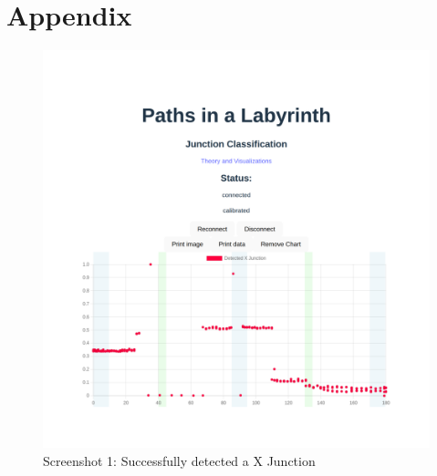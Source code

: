 \pagebreak
\section*{Appendix}

\begin{figure}[H]
    \centering
    \includegraphics[width=0.5\linewidth]{figures/screenshot.png}
    \caption{Screenshot 1: Successfully detected a X Junction}

    \label{fig:screenshot1}
\end{figure}
